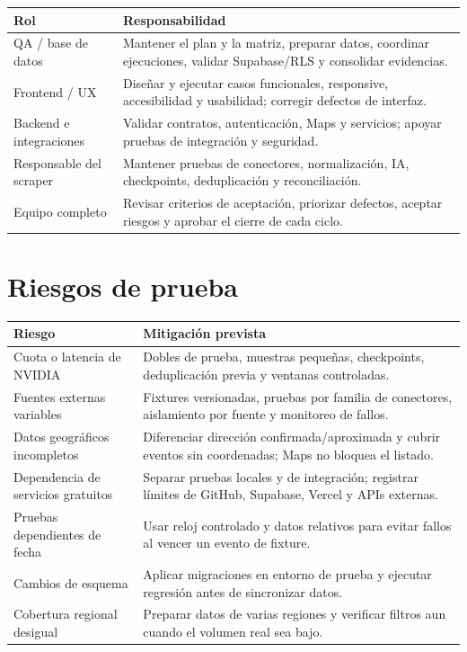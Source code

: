 \documentclass[11pt,a4paper]{article}
\begin{document}
\begin{longtable}{@{}L{3.7cm}L{11.1cm}@{}}
\toprule
\textbf{Rol} & \textbf{Responsabilidad} \\
\midrule
\endhead
QA / base de datos & Mantener el plan y la matriz, preparar datos, coordinar ejecuciones, validar Supabase/RLS y consolidar evidencias. \\
Frontend / UX & Diseñar y ejecutar casos funcionales, responsive, accesibilidad y usabilidad; corregir defectos de interfaz. \\
Backend e integraciones & Validar contratos, autenticación, Maps y servicios; apoyar pruebas de integración y seguridad. \\
Responsable del scraper & Mantener pruebas de conectores, normalización, IA, checkpoints, deduplicación y reconciliación. \\
Equipo completo & Revisar criterios de aceptación, priorizar defectos, aceptar riesgos y aprobar el cierre de cada ciclo. \\
\bottomrule
\end{longtable}

\section{Riesgos de prueba}

\begin{longtable}{@{}L{4.2cm}L{10.6cm}@{}}
\toprule
\textbf{Riesgo} & \textbf{Mitigación prevista} \\
\midrule
\endhead
Cuota o latencia de NVIDIA & Dobles de prueba, muestras pequeñas, checkpoints, deduplicación previa y ventanas controladas. \\
Fuentes externas variables & Fixtures versionadas, pruebas por familia de conectores, aislamiento por fuente y monitoreo de fallos. \\
Datos geográficos incompletos & Diferenciar dirección confirmada/aproximada y cubrir eventos sin coordenadas; Maps no bloquea el listado. \\
Dependencia de servicios gratuitos & Separar pruebas locales y de integración; registrar límites de GitHub, Supabase, Vercel y APIs externas. \\
Pruebas dependientes de fecha & Usar reloj controlado y datos relativos para evitar fallos al vencer un evento de fixture. \\
Cambios de esquema & Aplicar migraciones en entorno de prueba y ejecutar regresión antes de sincronizar datos. \\
Cobertura regional desigual & Preparar datos de varias regiones y verificar filtros aun cuando el volumen real sea bajo. \\
\bottomrule
\end{longtable}
\end{document}
